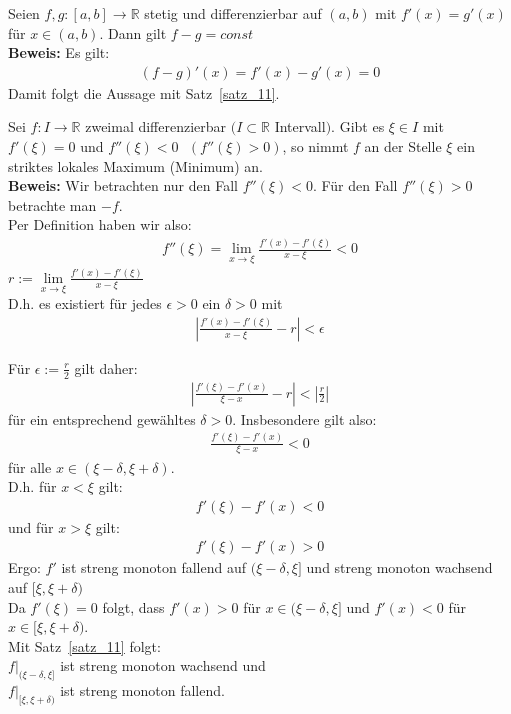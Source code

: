 \begin{Korollar}{
	Seien $f,g : [a,b] \rightarrow \mathbb{R}$ stetig und differenzierbar auf
	$(a,b)$ mit $f'(x) = g'(x)$ für $x \in (a,b)$. Dann gilt $f-g = const$\\
	\textbf{Beweis:} Es gilt: 
	\begin{align*}
		(f-g)'(x) = f'(x)-g'(x) = 0
	\end{align*}
	Damit folgt die Aussage mit Satz~\ref{satz_11}.
}\end{Korollar}

\begin{Satz}{
	Sei $f: I \rightarrow \mathbb{R}$ zweimal differenzierbar $(I \subset 
	\mathbb{R}$ Intervall$)$. Gibt es $\xi \in I$ mit $f'(\xi) = 0$ und 
	$f''(\xi) < 0 \textbf{ }  (f''(\xi)> 0)$, so nimmt $f$ an der Stelle $\xi$ ein 
	striktes lokales Maximum (Minimum) an.\\
	\textbf{Beweis:} Wir betrachten nur den Fall $f''(\xi) < 0$. Für den Fall
	$f''(\xi) > 0$ betrachte man $-f$.\\
	Per Definition haben wir also: 
	\begin{align*}
		f''(\xi) = \lim\limits_{x \rightarrow \xi}{\frac{f'(x) - f'(\xi)}{x - \xi} }
		< 0
	\end{align*}
	$r := \lim\limits_{x \rightarrow \xi}{\frac{f'(x) - f'(\xi)}{x - \xi} } $ \\
	D.h. es existiert für jedes $ \epsilon > 0$ ein $\delta > 0$ mit
	\begin{align*}
		\left\vert \frac{f'(x) - f'(\xi)}{x - \xi} - r \right\vert < \epsilon
	\end{align*}
	
	Für $\epsilon := \frac{r}{2}$ gilt daher: 
	\begin{align*}
		\left\vert \frac{f'(\xi) - f'(x)}{\xi - x}-r \right\vert < \left\vert \frac{r}{2} \right\vert
	\end{align*}
	für ein entsprechend gewähltes $\delta > 0$. Insbesondere gilt also:
	\begin{align*}
		\frac{f'(\xi)-f'(x)}{\xi - x} < 0
	\end{align*}
	für alle $ x \in ( \xi - \delta, \xi + \delta)$.\\
	D.h. für $x < \xi$ gilt: 
	\begin{align*}
		f'(\xi) - f'(x) < 0
	\end{align*}
	und für $ x > \xi$ gilt: 
	\begin{align*}
		f'(\xi) - f'(x) > 0
	\end{align*}
	Ergo: $f'$ ist streng monoton fallend auf $(\xi - \delta, \xi]$ und 
	streng monoton wachsend auf $[ \xi, \xi + \delta)$ \\
	Da $f'(\xi) = 0$ folgt, dass $f'(x) > 0$ für $x \in (\xi-\delta, \xi]$
	und $f'(x) <0 $ für $x \in [\xi, \xi + \delta)$.\\
	  Mit Satz~\ref{satz_11} folgt: \\
	  	\hspace*{5mm}$f|_{(\xi-\delta, \xi]}$ ist streng monoton wachsend und \\
	  	\hspace*{5mm}$f|_{[\xi, \xi + \delta)}$ ist streng monoton fallend.
}\end{Satz}

